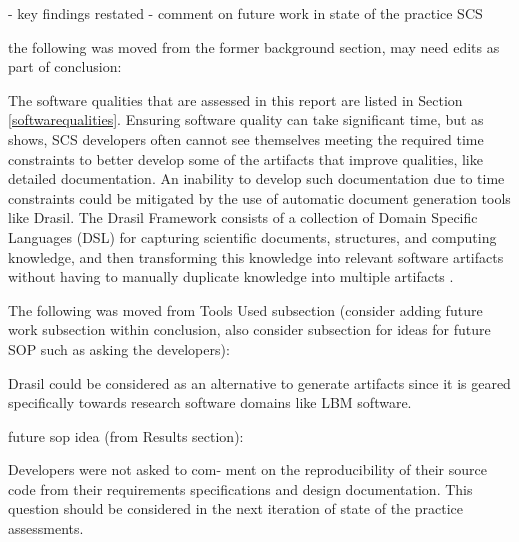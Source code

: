 \documentclass[12pt, notitlepage]{article}
\begin{document}
- key findings restated
- comment on future work in state of the practice SCS

the following was moved from the former background section, may need edits as part of conclusion:

  The software qualities that are assessed in this report are listed in Section \ref{softwarequalities}. Ensuring software quality can take significant time, but as \cite{SmithEtAl2016} shows, SCS developers often cannot see themselves meeting the required time constraints to better develop some of the artifacts that improve qualities, like detailed documentation. An inability to develop such documentation due to time constraints could be mitigated by the use of automatic document generation tools like Drasil. The Drasil Framework consists of a collection of Domain Specific Languages (DSL) for capturing scientific documents, structures, and computing
knowledge, and then transforming this knowledge into relevant software artifacts without having to manually duplicate knowledge into multiple artifacts \citep{zhao2018}.


The following was moved from Tools Used subsection (consider adding future work subsection within conclusion, also consider subsection for ideas for future SOP such as asking the developers):

Drasil could be considered as an alternative to generate artifacts since it is geared specifically towards research software domains like LBM software. 

future sop idea (from Results section):

Developers were not asked to com-
ment on the reproducibility of their source code from their requirements specifications and
design documentation. This question should be considered in the next iteration of state of
the practice assessments.


\newpage
\end{document}
